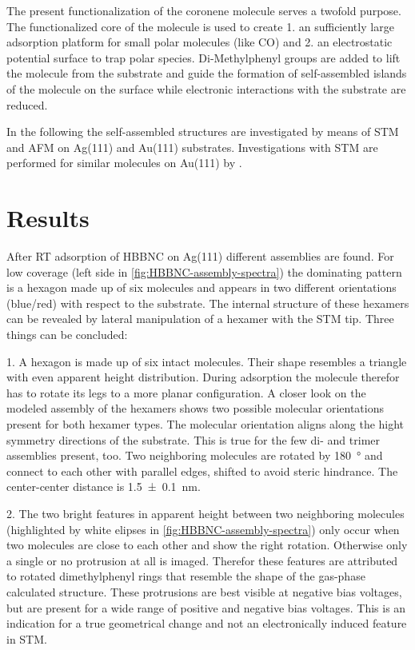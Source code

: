 The present functionalization of the coronene molecule serves a twofold purpose. The functionalized core of the molecule is used to create 1. an sufficiently large adsorption platform for small polar molecules (like CO) and 2. an electrostatic potential surface to trap polar species. 
Di-Methylphenyl groups are added to lift the molecule from the substrate and guide the formation of self-assembled islands of the molecule on the surface while electronic interactions with the substrate are reduced.

In the following the self-assembled structures are investigated by means of STM and AFM on Ag(111) and Au(111) substrates. Investigations with STM are performed for similar molecules on Au(111) by \cite{Krieg_construction_2015}.

\section{Results}
After RT adsorption of HBBNC on Ag(111) different assemblies are found. For low coverage (left side in \autoref{fig:HBBNC-assembly-spectra}) the dominating pattern is a hexagon made up of six molecules and appears in two different orientations (blue/red) with respect to the substrate. The internal structure of these hexamers can be revealed by lateral manipulation of a hexamer with the STM tip. Three things can be concluded: 

1. A hexagon is made up of six intact molecules. Their shape resembles a triangle with even apparent height distribution. During adsorption the molecule therefor has to rotate its legs to a more planar configuration. A closer look on the modeled assembly of the hexamers shows two possible molecular orientations present for both hexamer types. The molecular orientation aligns along the hight symmetry directions of the substrate. This is true for the few di- and trimer assemblies present, too. Two neighboring molecules are rotated by \SI{180}{\degree} and connect to each other with parallel edges, shifted to avoid steric hindrance. The center-center distance is \SI{1,5 \pm 0.1}{\nano \meter}.

2. The two bright features in apparent height between two neighboring molecules (highlighted by white elipses in \autoref{fig:HBBNC-assembly-spectra}) only occur when two molecules are close to each other and show the right rotation. Otherwise only a single or no protrusion at all is imaged. Therefor these features are attributed to rotated dimethylphenyl rings that resemble the shape of the gas-phase calculated structure. These protrusions are best visible at negative bias voltages, but are present for a wide range of positive and negative bias voltages. This is an indication for a true geometrical change and not an electronically induced feature in STM.

